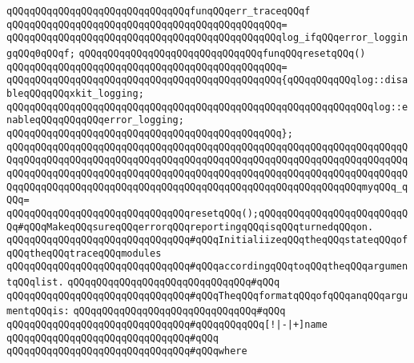 \newline
\verb|qQQqqQQqqQQqqQQqqQQqqQQqqQQqqQQqfunqQQqerr_traceqQQqf|\newline
\verb|qQQqqQQqqQQqqQQqqQQqqQQqqQQqqQQqqQQqqQQqqQQqqQQq=|\newline
\verb|qQQqqQQqqQQqqQQqqQQqqQQqqQQqqQQqqQQqqQQqqQQqqQQqlog_ifqQQqerror_loggingqQQq0qQQqf;|\newline
\newline
\verb|qQQqqQQqqQQqqQQqqQQqqQQqqQQqqQQqfunqQQqresetqQQq()|\newline
\verb|qQQqqQQqqQQqqQQqqQQqqQQqqQQqqQQqqQQqqQQqqQQqqQQq=|\newline
\verb|qQQqqQQqqQQqqQQqqQQqqQQqqQQqqQQqqQQqqQQqqQQqqQQq{qQQqqQQqqQQqlog::disableqQQqqQQqxkit_logging;|\newline
\verb|qQQqqQQqqQQqqQQqqQQqqQQqqQQqqQQqqQQqqQQqqQQqqQQqqQQqqQQqqQQqqQQqlog::enableqQQqqQQqqQQqerror_logging;|\newline
\verb|qQQqqQQqqQQqqQQqqQQqqQQqqQQqqQQqqQQqqQQqqQQqqQQq};|\newline
\newline
\verb|qQQqqQQqqQQqqQQqqQQqqQQqqQQqqQQqqQQqqQQqqQQqqQQqqQQqqQQqqQQqqQQqqQQqqQQqqQQqqQQqqQQqqQQqqQQqqQQqqQQqqQQqqQQqqQQqqQQqqQQqqQQqqQQqqQQqqQQqqQQqqQQqqQQqqQQqqQQqqQQqqQQqqQQqqQQqqQQqqQQqqQQqqQQqqQQqqQQqqQQqqQQqqQQqqQQqqQQqqQQqqQQqqQQqqQQqqQQqqQQqqQQqqQQqqQQqqQQqqQQqqQQqqQQqqQQqmyqQQq_qQQq=|\newline
\verb|qQQqqQQqqQQqqQQqqQQqqQQqqQQqqQQqresetqQQq();qQQqqQQqqQQqqQQqqQQqqQQqqQQq#qQQqMakeqQQqsureqQQqerrorqQQqreportingqQQqisqQQqturnedqQQqon.|\newline
\newline
\verb|qQQqqQQqqQQqqQQqqQQqqQQqqQQqqQQq#qQQqInitialiizeqQQqtheqQQqstateqQQqofqQQqtheqQQqtraceqQQqmodules|\newline
\verb|qQQqqQQqqQQqqQQqqQQqqQQqqQQqqQQq#qQQqaccordingqQQqtoqQQqtheqQQqargumentqQQqlist.|\newline
\verb|qQQqqQQqqQQqqQQqqQQqqQQqqQQqqQQq#qQQq|\newline
\verb|qQQqqQQqqQQqqQQqqQQqqQQqqQQqqQQq#qQQqTheqQQqformatqQQqofqQQqanqQQqargumentqQQqis:|\newline
\verb|qQQqqQQqqQQqqQQqqQQqqQQqqQQqqQQq#qQQq|\newline
\verb|qQQqqQQqqQQqqQQqqQQqqQQqqQQqqQQq#qQQqqQQqqQQq[!|\verb#|-|+]name#\newline
\verb|qQQqqQQqqQQqqQQqqQQqqQQqqQQqqQQq#qQQq|\newline
\verb|qQQqqQQqqQQqqQQqqQQqqQQqqQQqqQQq#qQQqwhere|\newline
